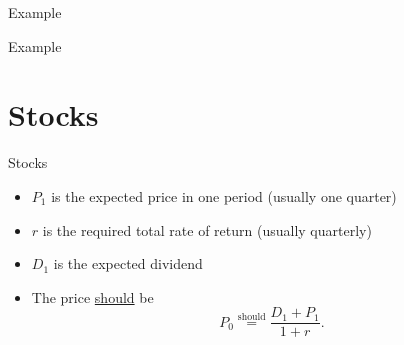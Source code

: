 \documentclass{beamer}
\newcommand{\should}{\overset{\text{should}}{=}}
\begin{document}
\begin{frame}{Example}
	
	\pause
	{\color{blue}}
\end{frame}

\begin{frame}{Example}
	
	\pause
	{\color{blue}}
\end{frame}

\section{Stocks}

\begin{frame}{Stocks}
	\begin{figure}[H]
		\begin{center}
		\end{center}
	\end{figure}
	\begin{itemize}
		\item $P_{1}$ is the expected price in one period (usually one quarter)
		\item $r$ is the required total rate of return (usually quarterly)
		\item $D_{1}$ is the expected dividend 
		\item The price \underline{should} be
		\begin{equation*}
			P_{0}\should\frac{D_{1}+P_{1}}{1+r}.
		\end{equation*}
	\end{itemize}
\end{frame}
\end{document}
